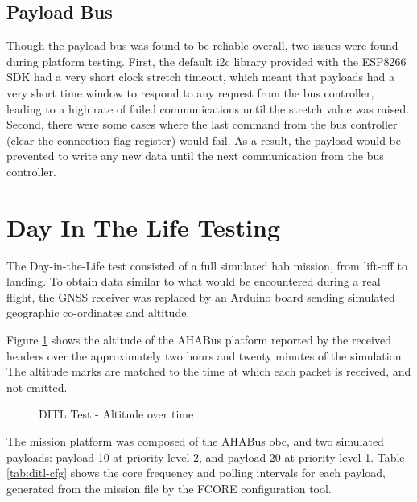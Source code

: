 \subsection{Payload Bus}
\label{ssec:results-bus}

Though the payload bus was found to be reliable overall, two issues were found
during platform testing. First, the default \acrshort{i2c} library provided
with the ESP8266 SDK had a very short clock stretch timeout, which meant that
payloads had a very short time window to respond to any request from the bus
controller, leading to a high rate of failed communications until the stretch
value was raised. Second, there were some cases where the last command from the
bus controller (clear the connection flag register) would fail. As a result,
the payload would be prevented to write any new data until the next
communication from the bus controller.

\section{Day In The Life Testing}
\label{ssec:results-ditl}

The Day-in-the-Life test consisted of a full simulated \acrlong{hab} mission,
from lift-off to landing. To obtain data similar to what would be encountered
during a real flight, the GNSS receiver was replaced by an Arduino board 
sending simulated geographic co-ordinates and altitude.

Figure \ref{fig:dit-alt} shows the altitude of the AHABus platform reported by
the received headers over the approximately two hours and twenty minutes of the
simulation. The altitude marks are matched to the time at which each packet
is received, and not emitted.

\begin{figure}[h]
\centering
\caption{DITL Test - Altitude over time}
\label{fig:dit-alt}
\end{figure}

The mission platform was composed of the AHABus \acrlong{obc}, and two simulated
payloads: payload 10 at priority level 2, and payload 20 at priority level 1.
Table \ref{tab:ditl-cfg} shows the core frequency and polling intervals for
each payload, generated from the mission file by the FCORE configuration tool.

